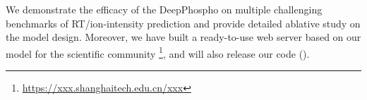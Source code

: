We demonstrate the efficacy of the DeepPhospho on multiple challenging benchmarks of RT/ion-intensity prediction and provide detailed ablative study on the model design. Moreover, we have built a ready-to-use web server based on our model for the scientific community \footnote{\url{https://xxx.shanghaitech.edu.cn/xxx}}, and will also release our code ().












